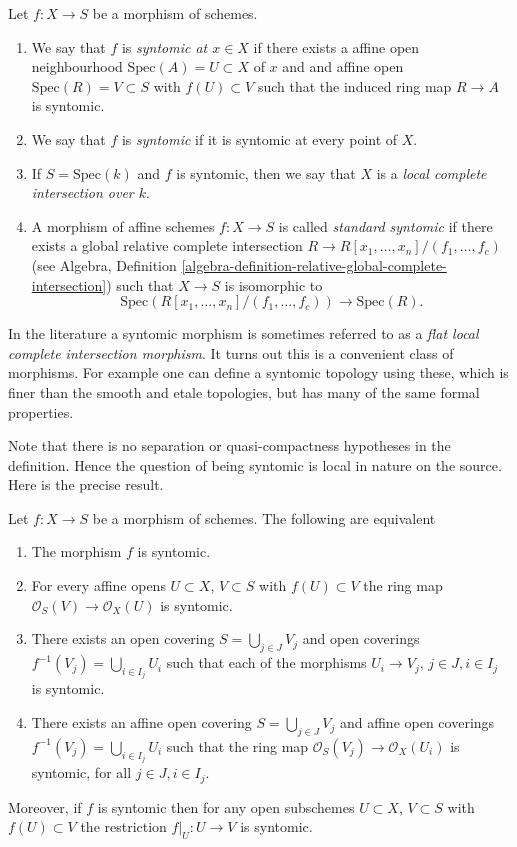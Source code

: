 \begin{definition}
\label{definition-syntomic}
Let $f : X \to S$ be a morphism of schemes.
\begin{enumerate}
\item We say that $f$ is {\it syntomic at $x \in X$} if
there exists a affine open neighbourhood $\text{Spec}(A) = U \subset X$
of $x$ and and affine open $\text{Spec}(R) = V \subset S$
with $f(U) \subset V$ such that the induced ring map
$R \to A$ is syntomic.
\item We say that $f$ is {\it syntomic} if it is syntomic
at every point of $X$.
\item If $S = \text{Spec}(k)$ and $f$ is syntomic, then we say that
$X$ is a {\it local complete intersection over $k$}.
\item A morphism of affine schemes $f : X \to S$
is called {\it standard syntomic} if there exists a
global relative complete intersection
$R \to R[x_1, \ldots, x_n]/(f_1, \ldots, f_c)$ (see
Algebra,
Definition \ref{algebra-definition-relative-global-complete-intersection})
such that $X \to S$ is isomorphic to
$$
\text{Spec}(R[x_1, \ldots, x_n]/(f_1, \ldots, f_c)) \to \text{Spec}(R).
$$
\end{enumerate}
\end{definition}

\noindent
In the literature a syntomic morphism is sometimes referred to as a
{\it flat local complete intersection morphism}.
It turns out this is a convenient class of morphisms. For example one
can define a syntomic topology using these, which is finer than the
smooth and etale topologies, but has many of the same formal properties.

\medskip\noindent
Note that there is no separation or quasi-compactness hypotheses in the
definition. Hence the question of being syntomic is local in nature on
the source. Here is the precise result.

\begin{lemma}
\label{lemma-syntomic-characterize}
Let $f : X \to S$ be a morphism of schemes.
The following are equivalent
\begin{enumerate}
\item The morphism $f$ is syntomic.
\item For every affine opens $U \subset X$, $V \subset S$
with $f(U) \subset V$ the ring map
$\mathcal{O}_S(V) \to \mathcal{O}_X(U)$ is syntomic.
\item There exists an open covering $S = \bigcup_{j \in J} V_j$
and open coverings $f^{-1}(V_j) = \bigcup_{i \in I_j} U_i$ such
that each of the morphisms $U_i \to V_j$, $j\in J, i\in I_j$
is syntomic.
\item There exists an affine open covering $S = \bigcup_{j \in J} V_j$
and affine open coverings $f^{-1}(V_j) = \bigcup_{i \in I_j} U_i$ such
that the ring map $\mathcal{O}_S(V_j) \to \mathcal{O}_X(U_i)$ is
syntomic, for all $j\in J, i\in I_j$.
\end{enumerate}
Moreover, if $f$ is syntomic then for
any open subschemes $U \subset X$, $V \subset S$ with $f(U) \subset V$
the restriction $f|_U : U \to V$ is syntomic.
\end{lemma}

